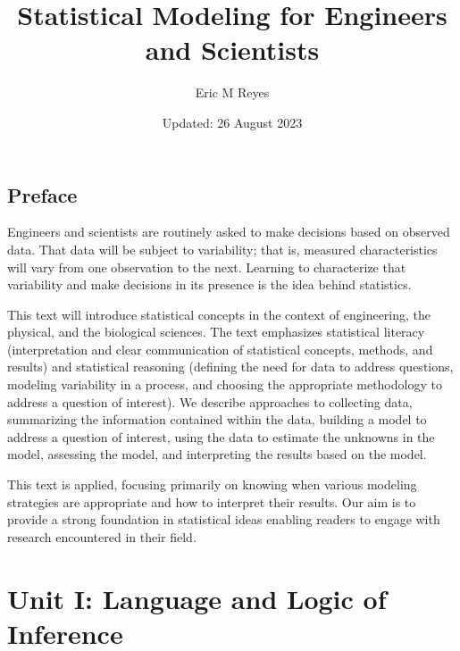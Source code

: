 \documentclass[
  letterpaper,
  DIV=11,
  numbers=noendperiod]{scrreprt}
\title{Statistical Modeling for Engineers and Scientists}
\author{Eric M Reyes}
\date{Updated: 26 August 2023}
\renewcommand*\contentsname{Table of contents}
\newcommand\contentsname{Table of contents}
\theoremstyle{definition}
\theoremstyle{definition}
\theoremstyle{plain}
\theoremstyle{remark}
\begin{document}
\maketitle
\ifdefined\Shaded\renewenvironment{Shaded}{\begin{tcolorbox}[interior hidden, frame hidden, borderline west={3pt}{0pt}{shadecolor}, sharp corners, breakable, boxrule=0pt, enhanced]}{\end{tcolorbox}}\fi

\renewcommand*\contentsname{Table of contents}
{
\hypersetup{linkcolor=}
\setcounter{tocdepth}{2}
\tableofcontents
}

\hypertarget{preface}{%
\chapter*{Preface}\label{preface}}


Engineers and scientists are routinely asked to make decisions based on
observed data. That data will be subject to variability; that is,
measured characteristics will vary from one observation to the next.
Learning to characterize that variability and make decisions in its
presence is the idea behind statistics.

This text will introduce statistical concepts in the context of
engineering, the physical, and the biological sciences. The text
emphasizes statistical literacy (interpretation and clear communication
of statistical concepts, methods, and results) and statistical reasoning
(defining the need for data to address questions, modeling variability
in a process, and choosing the appropriate methodology to address a
question of interest). We describe approaches to collecting data,
summarizing the information contained within the data, building a model
to address a question of interest, using the data to estimate the
unknowns in the model, assessing the model, and interpreting the results
based on the model.

This text is applied, focusing primarily on knowing when various
modeling strategies are appropriate and how to interpret their results.
Our aim is to provide a strong foundation in statistical ideas enabling
readers to engage with research encountered in their field.

\part{Unit I: Language and Logic of Inference}
\end{document}
